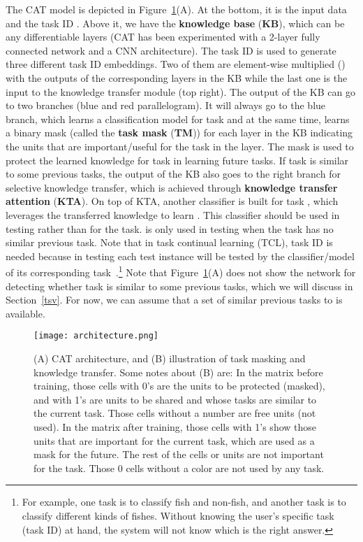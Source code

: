 \documentclass{article}
\begin{document}
The CAT model is depicted in Figure~\ref{overview}(A). At the bottom, it is the input data and the task ID . Above it, we have the \textbf{knowledge base} (\textbf{KB}), which can be any differentiable layers {\color{black}(CAT has been experimented with a 2-layer fully connected network and a CNN architecture).} The task ID  is used to generate three different task ID embeddings. Two of them are element-wise multiplied () with the outputs of the corresponding layers in the KB while the last one is the input to the knowledge transfer module (top right). The output of the KB can go to two branches (blue and red parallelogram). It will always go to the blue branch, which learns a classification model  for task  and at the same time, learns a binary mask (called the \textbf{task mask} (\textbf{TM})) for each layer in the KB indicating the units that are important/useful for the task in the layer. The mask is used to protect the learned knowledge for task  in learning future tasks. If task  is similar to some previous tasks, the output of the KB also goes to the right branch for selective knowledge transfer, which is achieved through \textbf{knowledge transfer attention} (\textbf{KTA}). On top of KTA, another classifier  is built for task , which leverages the transferred knowledge to learn . This classifier should be used in testing rather than  for the task.  is only used in testing when the task  has no similar previous task. Note that in task continual learning (TCL), task ID is needed because in testing each test instance will be tested by the classifier/model of its corresponding task~\citep{Ven2019Three}.\footnote{For example, one task is to classify fish and non-fish, and another task is to classify different kinds of fishes. Without knowing the user’s specific task (task ID) at hand, the system will not know which is the right answer.} 
{\color{black}Note that Figure~\ref{overview}(A) does not show the network for detecting whether task  is similar to some previous tasks, which we will discuss in Section~\ref{tsv}. For now, we can assume that a set of similar previous tasks to  is available.} 
\begin{figure}[]
\centering
\texttt{[image: architecture.png]}
\caption{(A) CAT architecture, and (B) illustration of task masking and knowledge transfer. Some notes about (B) are: In the matrix before training, those cells with 0's are the units to be protected (masked), and with 1's are units to be shared and whose tasks are similar to the current task. Those cells without a number are free units (not used). In the matrix after training, those cells with 1's show those units that are important for the current task, which are used as a mask for the future. The rest of the cells or units are not important for the task. Those 0 cells without a color are not used by any task. }
\vspace{-3mm}
\label{overview}
\end{figure}
\end{document}
